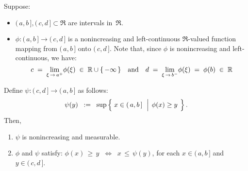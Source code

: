 
\begin{lemma}\label{lemma:nonincreasingLeftContinuous}
\mbox{}\vskip 0.1cm
\noindent
Suppose:
\begin{itemize}
\item
	$(\,a,b\,], (\,c,d\,] \subset \Re$ are intervals in \,$\Re$.
\item
	$\phi : (\,a,b\,] \longrightarrow (\,c,d\,]$ is a nonincreasing and left-continuous
	$\Re$-valued function mapping from $(\,a,b\,]$ {\color{red}onto} $(\,c,d\,]$.
	Note that, since $\phi$ is nonincreasing and left-continuous, we have:
	\begin{equation*}
	c \; = \; \underset{\xi\,\rightarrow\,a^{+}}{\lim}\phi(\xi) \; \in \; \Re\cup\{\,-\infty\,\}
	\quad\textnormal{and}\quad
	d \; = \; \underset{\xi\,\rightarrow\,b^{-}}{\lim}\phi(\xi) \; = \; \phi(b) \; \in \; \Re
	\end{equation*}
\end{itemize}
Define \;$\psi : (\,c,d\,] \longrightarrow (\,a,b\,]$\; as follows:
\begin{equation*}
\psi(y)
\;\; := \;\;
	\sup\left\{\;
		x \in (\,a,b\,]
	\,\;\left\vert\;\,
		\overset{{\color{white}.}}{\phi}(x) \geq y
	\right.
	\;\right\}.
\end{equation*}
Then,
\begin{enumerate}
\item
	$\psi$ is nonincreasing and measurable.
\item
	$\phi$ and $\psi$ satisfy:\quad
	$\phi(x) \,\geq\, y \;\; \Longleftrightarrow \;\; x \,\leq\, \psi(y)$,\;\;
	for each \;$x \in (\,a,b\,]$\; and \;$y \in (\,c,d\,]$.
\end{enumerate}
\end{lemma}
\proof
